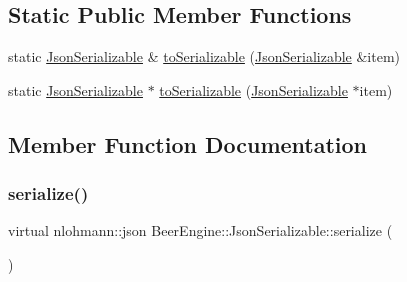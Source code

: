 \subsection*{Static Public Member Functions}
\begin{DoxyCompactItemize}
\item 
static \mbox{\hyperlink{class_beer_engine_1_1_json_serializable}{Json\+Serializable}} \& \mbox{\hyperlink{class_beer_engine_1_1_json_serializable_a48f83f0e913d9a7f4962f30ac8ff450b}{to\+Serializable}} (\mbox{\hyperlink{class_beer_engine_1_1_json_serializable}{Json\+Serializable}} \&item)
\item 
static \mbox{\hyperlink{class_beer_engine_1_1_json_serializable}{Json\+Serializable}} $\ast$ \mbox{\hyperlink{class_beer_engine_1_1_json_serializable_ae56f6be872da47edbb9a1f25a2eccc0e}{to\+Serializable}} (\mbox{\hyperlink{class_beer_engine_1_1_json_serializable}{Json\+Serializable}} $\ast$item)
\end{DoxyCompactItemize}


\subsection{Member Function Documentation}
\mbox{\label{class_beer_engine_1_1_json_serializable_a17689cbd8fe282c570bd026cc1be5b3b}} 
\subsubsection{\texorpdfstring{serialize()}{serialize()}}
{\footnotesize\ttfamily virtual nlohmann\+::json Beer\+Engine\+::\+Json\+Serializable\+::serialize (\begin{DoxyParamCaption}{ }\end{DoxyParamCaption})\hspace{0.3cm}{\ttfamily [pure virtual]}}



